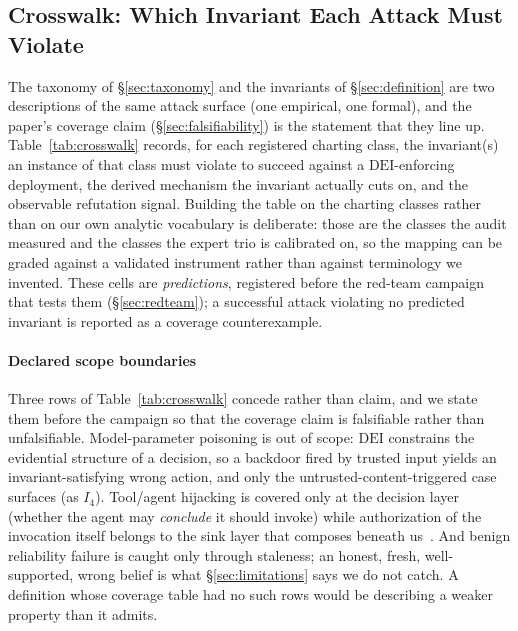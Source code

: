 \documentclass[conference]{IEEEtran}
\newcommand{\Ifour}{\ensuremath{I_4}}
\newcommand{\DEI}{\ensuremath{\mathrm{DEI}}}
\begin{document}
\subsection{Crosswalk: Which Invariant Each Attack Must Violate}
\label{sec:crosswalk}
The taxonomy of \S\ref{sec:taxonomy} and the invariants of
\S\ref{sec:definition} are two descriptions of the same attack
surface (one empirical, one formal), and the paper's coverage
claim (\S\ref{sec:falsifiability}) is the statement that
they line up. Table~\ref{tab:crosswalk} records, for each
registered charting class, the invariant(s) an instance of that
class must violate to succeed against a \DEI-enforcing deployment,
the derived mechanism the invariant actually cuts on, and the
observable refutation signal. Building the table on the charting
classes rather than on our own analytic vocabulary is deliberate:
those are the classes the audit measured and the classes the
expert trio is calibrated on, so the mapping can be graded against
a validated instrument rather than against terminology we
invented. These cells are \emph{predictions}, registered before
the red-team campaign that tests them (\S\ref{sec:redteam}); a
successful attack violating no predicted invariant is reported as
a coverage counterexample.

\paragraph*{Declared scope boundaries}
Three rows of Table~\ref{tab:crosswalk} concede rather than claim,
and we state them before the campaign so that the coverage claim
is falsifiable rather than unfalsifiable. Model-parameter
poisoning is out of scope: \DEI{} constrains the evidential
structure of a decision, so a backdoor fired by trusted input
yields an invariant-satisfying wrong action, and only the
untrusted-content-triggered case surfaces (as \Ifour). Tool/agent
hijacking is covered only at the decision layer (whether the
agent may \emph{conclude} it should invoke) while authorization
of the invocation itself belongs to the sink layer that composes
beneath us~\cite{cxi}. And benign reliability failure is caught
only through staleness; an honest, fresh, well-supported, wrong
belief is what \S\ref{sec:limitations} says we do not
catch. A definition whose coverage table had no such rows would be
describing a weaker property than it admits.
\end{document}
